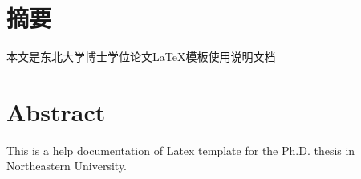 \chapter{摘\quad 要}%
\linespread{1.5}

本文是东北大学博士学位论文\LaTeX{}模板使用说明文档

\chapter{Abstract}%

This is a help documentation of Latex template for the Ph.D. thesis in Northeastern University.

